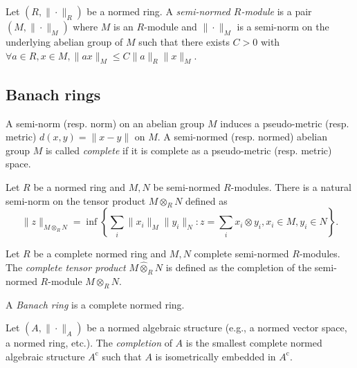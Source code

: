     \begin{definition}\label{def:semi-normed_modules}
        Let \((R, \|\cdot\|_R)\) be a normed ring.
        A \emph{semi-normed \(R\)-module} is a pair \((M, \|\cdot\|_M)\) where \(M\) is an \(R\)-module and \(\|\cdot\|_M\) is a semi-norm on the underlying abelian group of \(M\) such that there exists \(C > 0\) with \(\forall a \in R, x \in M, \|ax\|_M \leq C \|a\|_R \|x\|_M\).
    \end{definition}




\subsection{Banach rings}

    \begin{definition}\label{def:complete_semi-normed_abelian_group}
        A semi-norm (resp. norm) on an abelian group \(M\) induces a pseudo-metric (resp. metric) \(d(x,y) = \|x - y\|\) on \(M\).
        A semi-normed (resp. normed) abelian group \(M\) is called \emph{complete} if it is complete as a pseudo-metric (resp. metric) space.
    \end{definition}

    Let \(R\) be a normed ring and \(M,N\) be semi-normed \(R\)-modules.
    There is a natural semi-norm on the tensor product \(M \otimes_R N\) defined as
    \[
        \|z\|_{M \otimes_R N} = \inf \left\{ \sum_{i} \|x_i\|_M \|y_i\|_N : z = \sum_i x_i \otimes y_i, x_i \in M, y_i \in N \right\}.
    \]

    \begin{definition}\label{def:complete_tensor_product}
        Let \(R\) be a complete normed ring and \(M,N\) complete semi-normed \(R\)-modules.
        The \emph{complete tensor product} \(M \widehat{\otimes}_R N\) is defined as the completion of the semi-normed \(R\)-module \(M \otimes_R N\).
    \end{definition}

    \begin{definition}\label{def:banach_ring}
        A \emph{Banach ring} is a complete normed ring.
    \end{definition}

    \begin{definition}\label{def:completion_of_normed_algebraic_structures}
        Let \((A, \|\cdot\|_A)\) be a normed algebraic structure (e.g., a normed vector space, a normed ring, etc.).
        The \emph{completion} of \(A\) is the smallest complete normed algebraic structure \(A^{\mathrm{c}}\) such that \(A\) is isometrically embedded in \(A^{\mathrm{c}}\).
    \end{definition}

